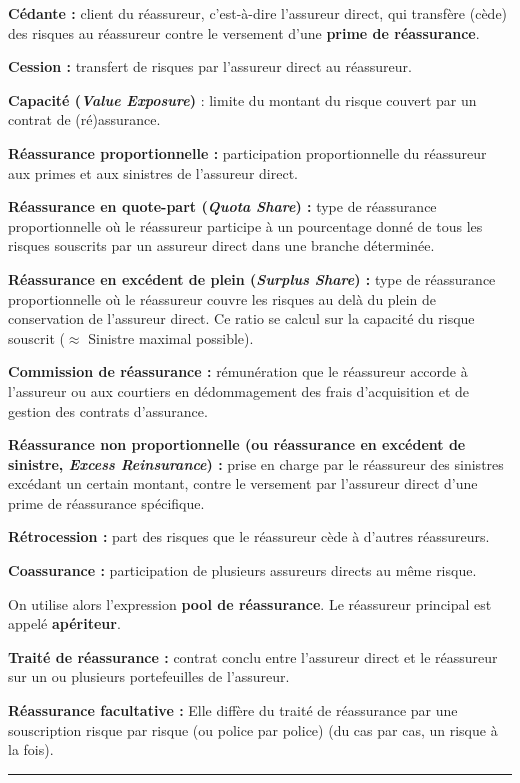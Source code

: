 
\begin{f}

\textbf{Cédante :} client du réassureur, c'est-à-dire l'assureur direct, qui transfère (cède) des risques au réassureur contre le versement
d'une \textbf{prime de réassurance}.

\textbf{Cession :} transfert de risques par l'assureur direct au réassureur.

\textbf{Capacité (\emph{Value Exposure})} : limite du montant du risque couvert par un contrat de (ré)assurance.

\textbf{Réassurance proportionnelle :} participation proportionnelle du réassureur aux primes et aux sinistres de l'assureur direct.

\textbf{Réassurance en quote-part (\emph{Quota Share}) :} type de réassurance proportionnelle où le  réassureur participe à un pourcentage donné de tous les risques souscrits par un assureur direct dans une branche déterminée.

\textbf{Réassurance en excédent de plein (\emph{Surplus Share}) :} type de réassurance proportionnelle où le  réassureur couvre les risques au delà du plein de
conservation de l'assureur direct. Ce ratio se calcul sur la capacité du risque souscrit ($\approx$ Sinistre maximal possible).

\textbf{Commission de réassurance :} rémunération que le réassureur accorde à l'assureur ou aux courtiers en dédommagement des frais d'acquisition et de gestion des contrats d'assurance.

\textbf{Réassurance non proportionnelle (ou réassurance en excédent de sinistre, \emph{Excess Reinsurance}) :}
 prise en charge par le réassureur des sinistres excédant un certain montant, contre le versement par l'assureur direct d'une prime de réassurance spécifique.

\textbf{Rétrocession :}  part des risques que le réassureur cède à d'autres réassureurs.

\textbf{Coassurance :} participation de plusieurs assureurs directs au même risque.

On utilise alors l'expression \textbf{pool de réassurance}. 
Le réassureur principal est appelé \textbf{apériteur}. 

\textbf{Traité de réassurance :} contrat conclu entre l'assureur direct et le réassureur sur un ou plusieurs portefeuilles de l'assureur.

\textbf{Réassurance facultative :}
Elle diffère du traité de réassurance par une souscription risque par risque (ou police par police) (du cas par cas, un risque à la fois). 

\end{f}
\hrule





